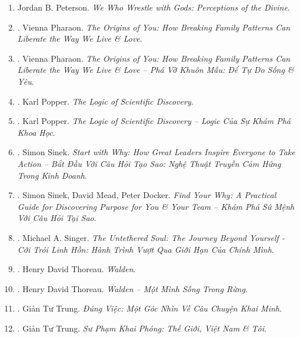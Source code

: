 \documentclass{article}
\begin{document}
\begin{enumerate}
	\item {\sc Jordan B. Peterson}. {\it We Who Wrestle with Gods: Perceptions of the Divine}.

	\item \cite{Pharaon_origins}. {\sc Vienna Pharaon}. {\it The Origins of You: How Breaking Family Patterns Can Liberate the Way We Live \& Love}.

	\item \cite{Pharaon_origins_VN}. {\sc Vienna Pharaon}. {\it The Origins of You: How Breaking Family Patterns Can Liberate the Way We Live \& Love -- Phá Vỡ Khuôn Mẫu: Để Tự Do Sống \& Yêu}.\hfill{\sf[done]}

	\item \cite{Popper_logic_science}. {\sc Karl Popper}. {\it The Logic of Scientific Discovery}.

	\item \cite{Popper_logic_khoa_hoc}. {\sc Karl Popper}. {\it The Logic of Scientific Discovery -- Logic Của Sự Khám Phá Khoa Học}.\hfill{\sf[done]}

	\item \cite{Sinek_start_why}. {\sc Simon Sinek}. {\it Start with Why: How Great Leaders Inspire Everyone to Take Action -- Bắt Đầu Với Câu Hỏi Tạo Sao: Nghệ Thuật Truyền Cảm Hứng Trong Kinh Doanh}.\hfill{\sf[done]}

	\item \cite{Sinek_Mead_Docker_why}. {\sc Simon Sinek, David Mead, Peter Docker}. {\it Find Your Why: A Practical Guide for Discovering Purpose for You \& Your Team -- Khám Phá Sứ Mệnh Với Câu Hỏi Tại Sao}.\hfill{\sf[done]}
	
	\item \cite{Singer_untethered_soul_VN}. {\sc Michael A. Singer}. {\it The Untethered Soul: The Journey Beyond Yourself - Cởi Trói Linh Hồn: Hành Trình Vượt Qua Giới Hạn Của Chính Mình}.\hfill{\sf[done]}

	\item \cite{Thoreau_Walden}. {\sc Henry David Thoreau}. {\it Walden}.\hfill{\sf[done]}

	\item \cite{Thoreau_Walden_VN}. {\sc Henry David Thoreau}. {\it Walden -- Một Mình Sống Trong Rừng}.\hfill{\sf[done]}

	\item \cite{Trung_dung_viec}. {\sc Giản Tư Trung}. {\it Đúng Việc: Một Góc Nhìn Về Câu Chuyện Khai Minh}.\hfill{\sf[done]}

	\item \cite{Trung_edu}. {\sc Giản Tư Trung}. {\it Sư Phạm Khai Phóng: Thế Giới, Việt Nam \& Tôi}.\hfill{\sf[done]}


\end{enumerate}
\end{document}
